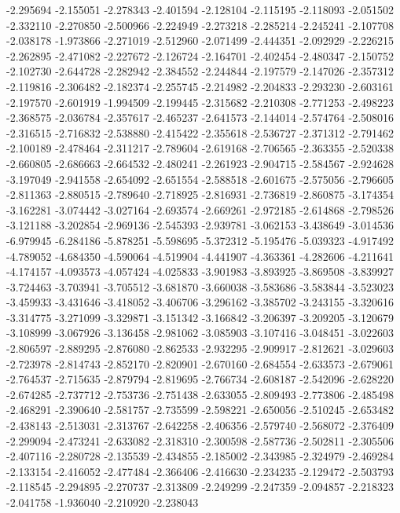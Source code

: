 -2.295694
-2.155051
-2.278343
-2.401594
-2.128104
-2.115195
-2.118093
-2.051502
-2.332110
-2.270850
-2.500966
-2.224949
-2.273218
-2.285214
-2.245241
-2.107708
-2.038178
-1.973866
-2.271019
-2.512960
-2.071499
-2.444351
-2.092929
-2.226215
-2.262895
-2.471082
-2.227672
-2.126724
-2.164701
-2.402454
-2.480347
-2.150752
-2.102730
-2.644728
-2.282942
-2.384552
-2.244844
-2.197579
-2.147026
-2.357312
-2.119816
-2.306482
-2.182374
-2.255745
-2.214982
-2.204833
-2.293230
-2.603161
-2.197570
-2.601919
-1.994509
-2.199445
-2.315682
-2.210308
-2.771253
-2.498223
-2.368575
-2.036784
-2.357617
-2.465237
-2.641573
-2.144014
-2.574764
-2.508016
-2.316515
-2.716832
-2.538880
-2.415422
-2.355618
-2.536727
-2.371312
-2.791462
-2.100189
-2.478464
-2.311217
-2.789604
-2.619168
-2.706565
-2.363355
-2.520338
-2.660805
-2.686663
-2.664532
-2.480241
-2.261923
-2.904715
-2.584567
-2.924628
-3.197049
-2.941558
-2.654092
-2.651554
-2.588518
-2.601675
-2.575056
-2.796605
-2.811363
-2.880515
-2.789640
-2.718925
-2.816931
-2.736819
-2.860875
-3.174354
-3.162281
-3.074442
-3.027164
-2.693574
-2.669261
-2.972185
-2.614868
-2.798526
-3.121188
-3.202854
-2.969136
-2.545393
-2.939781
-3.062153
-3.438649
-3.014536
-6.979945
-6.284186
-5.878251
-5.598695
-5.372312
-5.195476
-5.039323
-4.917492
-4.789052
-4.684350
-4.590064
-4.519904
-4.441907
-4.363361
-4.282606
-4.211641
-4.174157
-4.093573
-4.057424
-4.025833
-3.901983
-3.893925
-3.869508
-3.839927
-3.724463
-3.703941
-3.705512
-3.681870
-3.660038
-3.583686
-3.583844
-3.523023
-3.459933
-3.431646
-3.418052
-3.406706
-3.296162
-3.385702
-3.243155
-3.320616
-3.314775
-3.271099
-3.329871
-3.151342
-3.166842
-3.206397
-3.209205
-3.120679
-3.108999
-3.067926
-3.136458
-2.981062
-3.085903
-3.107416
-3.048451
-3.022603
-2.806597
-2.889295
-2.876080
-2.862533
-2.932295
-2.909917
-2.812621
-3.029603
-2.723978
-2.814743
-2.852170
-2.820901
-2.670160
-2.684554
-2.633573
-2.679061
-2.764537
-2.715635
-2.879794
-2.819695
-2.766734
-2.608187
-2.542096
-2.628220
-2.674285
-2.737712
-2.753736
-2.751438
-2.633055
-2.809493
-2.773806
-2.485498
-2.468291
-2.390640
-2.581757
-2.735599
-2.598221
-2.650056
-2.510245
-2.653482
-2.438143
-2.513031
-2.313767
-2.642258
-2.406356
-2.579740
-2.568072
-2.376409
-2.299094
-2.473241
-2.633082
-2.318310
-2.300598
-2.587736
-2.502811
-2.305506
-2.407116
-2.280728
-2.135539
-2.434855
-2.185002
-2.343985
-2.324979
-2.469284
-2.133154
-2.416052
-2.477484
-2.366406
-2.416630
-2.234235
-2.129472
-2.503793
-2.118545
-2.294895
-2.270737
-2.313809
-2.249299
-2.247359
-2.094857
-2.218323
-2.041758
-1.936040
-2.210920
-2.238043
